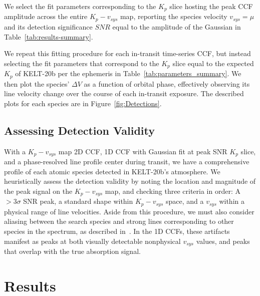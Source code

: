 \documentclass[twocolumn]{aastex631}
\begin{document}
            We select the fit parameters corresponding to the $K_p$ slice hosting the peak CCF amplitude across the entire $K_p-v_{sys}$ map, reporting the species velocity $v_{sys} = \mu$ and its detection significance $SNR$ equal to the amplitude of the Gaussian in Table~\ref{tab:results-summary}.
            
            We repeat this fitting procedure for each in-transit time-series CCF, but instead selecting the fit parameters that correspond to the $K_p$ slice equal to the expected $K_p$ of KELT-20b per the ephemeris in Table~\ref{tab:parameters_summary}. We then plot the species' $\Delta V$ as a function of orbital phase, effectively observing its line velocity change over the course of each in-transit exposure. The described plots for each species are in Figure~\ref{fig:Detections}. 

        \subsection{Assessing Detection Validity}\label{subsec:Assessing Detection Results}
            With a ${K_p-v_{sys}}$ map 2D CCF, 1D CCF with Gaussian fit at peak SNR $K_p$ slice, and a phase-resolved line profile center during transit, we have a comprehensive profile of each atomic species detected in KELT-20b's atmosphere. We heuristically assess the detection validity by noting the location and magnitude of the peak signal on the ${K_p-v_{sys}}$ map, and checking three criteria in order: A $>{3\sigma}$ SNR peak, a standard shape within ${K_p-v_{sys}}$ space, and a $v_{sys}$ within a physical range of line velocities. Aside from this procedure, we must also consider aliasing between the search species and strong lines corresponding to other species in the spectrum, as described in~\citet{Borsato2023}. In the 1D CCFs, these artifacts manifest as peaks at both visually detectable nonphysical $v_{sys}$ values, and peaks that overlap with the true absorption signal.
            
            
    \section{Results}\label{sec:Results}
\end{document}
